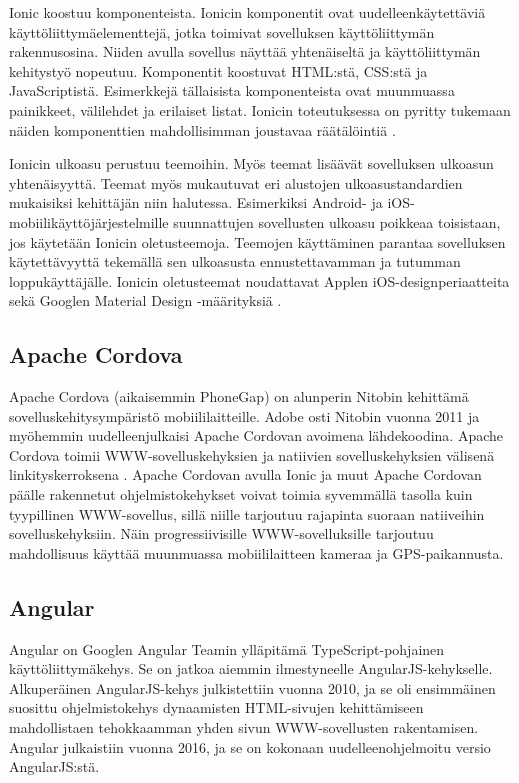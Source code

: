 \documentclass[utf8]{gradu3}
\begin{document}
Ionic koostuu komponenteista. Ionicin komponentit ovat uudelleenkäytettäviä käyttöliittymäelementtejä, jotka toimivat sovelluksen käyttöliittymän rakennusosina. Niiden avulla sovellus näyttää yhtenäiseltä ja käyttöliittymän kehitystyö nopeutuu. Komponentit koostuvat HTML:stä, CSS:stä ja JavaScriptistä. Esimerkkejä tällaisista komponenteista ovat muunmuassa painikkeet, välilehdet ja erilaiset listat. Ionicin toteutuksessa on pyritty tukemaan näiden komponenttien mahdollisimman joustavaa räätälöintiä \parencite[]{ionic-documentation}.

Ionicin ulkoasu perustuu teemoihin. Myös teemat lisäävät sovelluksen ulkoasun yhtenäisyyttä. Teemat myös mukautuvat eri alustojen ulkoasustandardien mukaisiksi kehittäjän niin halutessa. Esimerkiksi Android- ja iOS-mobiilikäyttöjärjestelmille suunnattujen sovellusten ulkoasu poikkeaa toisistaan, jos käytetään Ionicin oletusteemoja. Teemojen käyttäminen parantaa sovelluksen käytettävyyttä tekemällä sen ulkoasusta ennustettavamman ja tutumman loppukäyttäjälle. Ionicin oletusteemat noudattavat Applen iOS-designperiaatteita \parencite[]{ios-design-guide} sekä Googlen Material Design -määrityksiä \parencite[]{google-material-design}.

\subsection{Apache Cordova}

Apache Cordova (aikaisemmin PhoneGap) on alunperin Nitobin kehittämä sovelluskehitysympäristö mobiililaitteille. Adobe osti Nitobin vuonna 2011 ja myöhemmin uudelleenjulkaisi Apache Cordovan avoimena lähdekoodina. Apache Cordova toimii WWW-sovelluskehyksien ja natiivien sovelluskehyksien välisenä linkityskerroksena \parencite[]{ionic-framework-hybrid}. Apache Cordovan avulla Ionic ja muut Apache Cordovan päälle rakennetut ohjelmistokehykset voivat toimia syvemmällä tasolla kuin tyypillinen WWW-sovellus, sillä niille tarjoutuu rajapinta suoraan natiiveihin sovelluskehyksiin. Näin progressiivisille WWW-sovelluksille tarjoutuu mahdollisuus käyttää muunmuassa mobiililaitteen kameraa ja GPS-paikannusta.

\subsection{Angular}

Angular on Googlen Angular Teamin ylläpitämä TypeScript-pohjainen käyttöliittymäkehys. Se on jatkoa aiemmin ilmestyneelle AngularJS-kehykselle. Alkuperäinen AngularJS-kehys julkistettiin vuonna 2010, ja se oli ensimmäinen suosittu ohjelmistokehys dynaamisten HTML-sivujen kehittämiseen mahdollistaen tehokkaamman yhden sivun WWW-sovellusten rakentamisen. Angular julkaistiin vuonna 2016, ja se on kokonaan uudelleenohjelmoitu versio AngularJS:stä.
\end{document}
